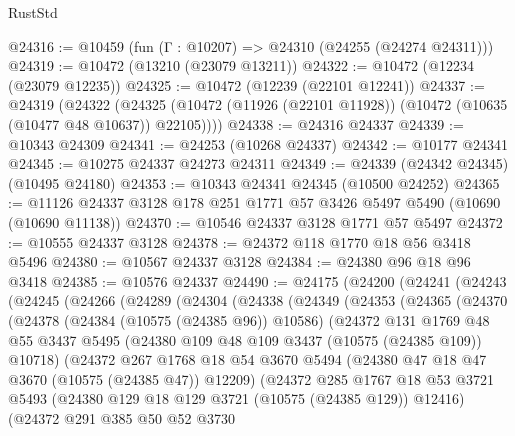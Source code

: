\begin{lexlean}{RustStd}
\begin{coremodule}
@24316 := @10459 (fun (Γ : @10207) => @24310 (@24255 (@24274 @24311)))
@24319 := @10472 (@13210 (@23079 @13211))
@24322 := @10472 (@12234 (@23079 @12235))
@24325 := @10472 (@12239 (@22101 @12241))
@24337 := @24319
    (@24322 (@24325 (@10472 (@11926 (@22101 @11928)) (@10472 (@10635 (@10477 @48 @10637)) @22105))))
@24338 := @24316 @24337
@24339 := @10343 @24309
@24341 := @24253 (@10268 @24337)
@24342 := @10177 @24341
@24345 := @10275 @24337 @24273 @24311
@24349 := @24339 (@24342 @24345) (@10495 @24180)
@24353 := @10343 @24341 @24345 (@10500 @24252)
@24365 := @11126 @24337 @3128 @178 @251 @1771 @57 @3426 @5497 @5490 (@10690 (@10690 @11138))
@24370 := @10546 @24337 @3128 @1771 @57 @5497
@24372 := @10555 @24337 @3128
@24378 := @24372 @118 @1770 @18 @56 @3418 @5496
@24380 := @10567 @24337 @3128
@24384 := @24380 @96 @18 @96 @3418
@24385 := @10576 @24337
@24490 := @24175
    (@24200
      (@24241
        (@24243
          (@24245
            (@24266
              (@24289
                (@24304
                  (@24338
                    (@24349
                      (@24353
                        (@24365
                          (@24370
                            (@24378
                              (@24384 (@10575 (@24385 @96)) @10586)
                              (@24372
                                @131
                                @1769
                                @48
                                @55
                                @3437
                                @5495
                                (@24380 @109 @48 @109 @3437 (@10575 (@24385 @109)) @10718)
                                (@24372
                                  @267
                                  @1768
                                  @18
                                  @54
                                  @3670
                                  @5494
                                  (@24380 @47 @18 @47 @3670 (@10575 (@24385 @47)) @12209)
                                  (@24372
                                    @285
                                    @1767
                                    @18
                                    @53
                                    @3721
                                    @5493
                                    (@24380 @129 @18 @129 @3721 (@10575 (@24385 @129)) @12416)
                                    (@24372
                                      @291
                                      @385
                                      @50
                                      @52
                                      @3730

\end{coremodule}
\end{lexlean}

